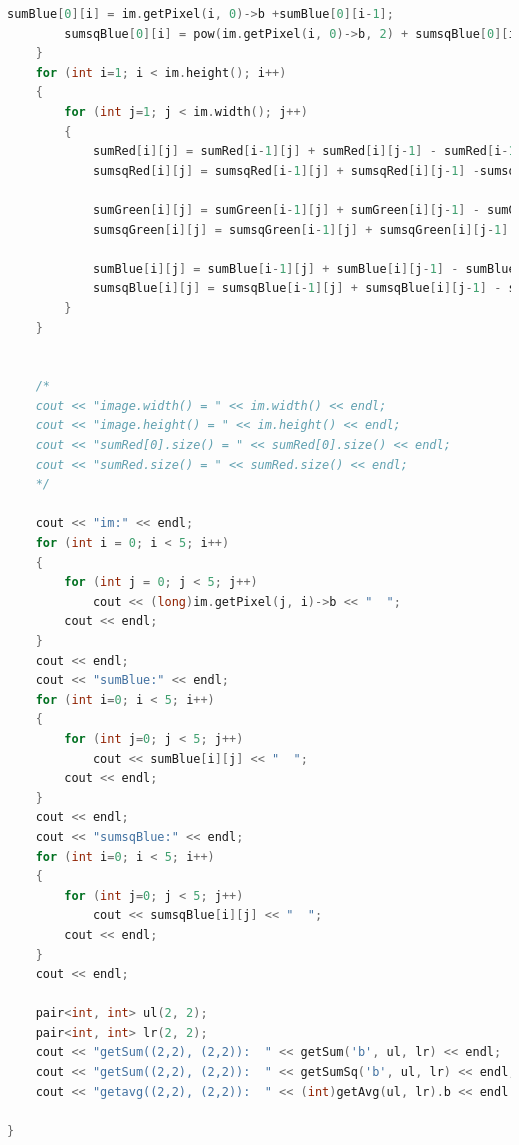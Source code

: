 \documentclass[UTF8]{ctexart}
\begin{document}
\begin{lstlisting}[language=C++,caption={twoDTree.cpp},label={twoDTree.cpp}]
        sumBlue[0][i] = im.getPixel(i, 0)->b +sumBlue[0][i-1];
        sumsqBlue[0][i] = pow(im.getPixel(i, 0)->b, 2) + sumsqBlue[0][i-1];
    }
    for (int i=1; i < im.height(); i++)
    {
        for (int j=1; j < im.width(); j++)
        {
            sumRed[i][j] = sumRed[i-1][j] + sumRed[i][j-1] - sumRed[i-1][j-1] + im.getPixel(j, i)->r;
            sumsqRed[i][j] = sumsqRed[i-1][j] + sumsqRed[i][j-1] -sumsqRed[i-1][j-1] + pow(im.getPixel(j, i)->r, 2);

            sumGreen[i][j] = sumGreen[i-1][j] + sumGreen[i][j-1] - sumGreen[i-1][j-1] + im.getPixel(j, i)->g;
            sumsqGreen[i][j] = sumsqGreen[i-1][j] + sumsqGreen[i][j-1] - sumsqGreen[i-1][j-1] + pow(im.getPixel(j, i)->g, 2);

            sumBlue[i][j] = sumBlue[i-1][j] + sumBlue[i][j-1] - sumBlue[i-1][j-1] + im.getPixel(j, i)->b;
            sumsqBlue[i][j] = sumsqBlue[i-1][j] + sumsqBlue[i][j-1] - sumsqBlue[i-1][j-1] + pow(im.getPixel(j, i)->b, 2);
        }
    }


    /*
    cout << "image.width() = " << im.width() << endl;
    cout << "image.height() = " << im.height() << endl;
    cout << "sumRed[0].size() = " << sumRed[0].size() << endl;
    cout << "sumRed.size() = " << sumRed.size() << endl;
    */

    cout << "im:" << endl;
    for (int i = 0; i < 5; i++)
    {
        for (int j = 0; j < 5; j++)
            cout << (long)im.getPixel(j, i)->b << "  ";
        cout << endl;
    }
    cout << endl;
    cout << "sumBlue:" << endl;
    for (int i=0; i < 5; i++)
    {
        for (int j=0; j < 5; j++)
            cout << sumBlue[i][j] << "  ";
        cout << endl;
    }
    cout << endl;
    cout << "sumsqBlue:" << endl;
    for (int i=0; i < 5; i++)
    {
        for (int j=0; j < 5; j++)
            cout << sumsqBlue[i][j] << "  ";
        cout << endl;
    }
    cout << endl;
    
    pair<int, int> ul(2, 2);
    pair<int, int> lr(2, 2);
    cout << "getSum((2,2), (2,2)):  " << getSum('b', ul, lr) << endl;
    cout << "getSum((2,2), (2,2)):  " << getSumSq('b', ul, lr) << endl;
    cout << "getavg((2,2), (2,2)):  " << (int)getAvg(ul, lr).b << endl << endl;

}


\end{lstlisting}
\end{document}
